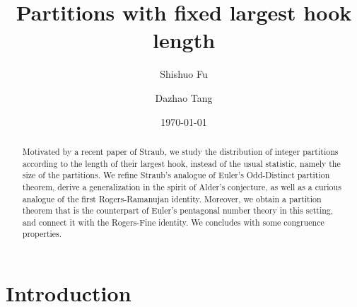 \documentclass[12pt]{amsart}
\numberwithin{equation}{section}
\theoremstyle{plain}
\theoremstyle{definition}
\begin{document}
\title[Fixed largest hook length]{Partitions with fixed largest hook length}

\author[S. Fu]{Shishuo Fu}
\address[Shishuo Fu]{College of Mathematics and Statistics, Chongqing University, Huxi campus LD301, Chongqing 401331, P.R. China}


\author[D. Tang]{Dazhao Tang}

\address[Dazhao Tang]{College of Mathematics and Statistics, Chongqing University, Huxi campus LD208, Chongqing 401331, P.R. China}

\date{\today}


\begin{abstract}
Motivated by a recent paper of Straub, we study the distribution of integer partitions according to the length of their largest hook, instead of the usual statistic, namely the size of the partitions. We refine Straub's analogue of Euler's Odd-Distinct partition theorem, derive a generalization in the spirit of Alder's conjecture, as well as a curious analogue of the first Rogers-Ramanujan identity. Moreover, we obtain a partition theorem that is the counterpart of Euler's pentagonal number theory in this setting, and connect it with the Rogers-Fine identity. We concludes with some congruence properties.
\end{abstract}


\maketitle


\section{Introduction}\label{sec1}
\end{document}
